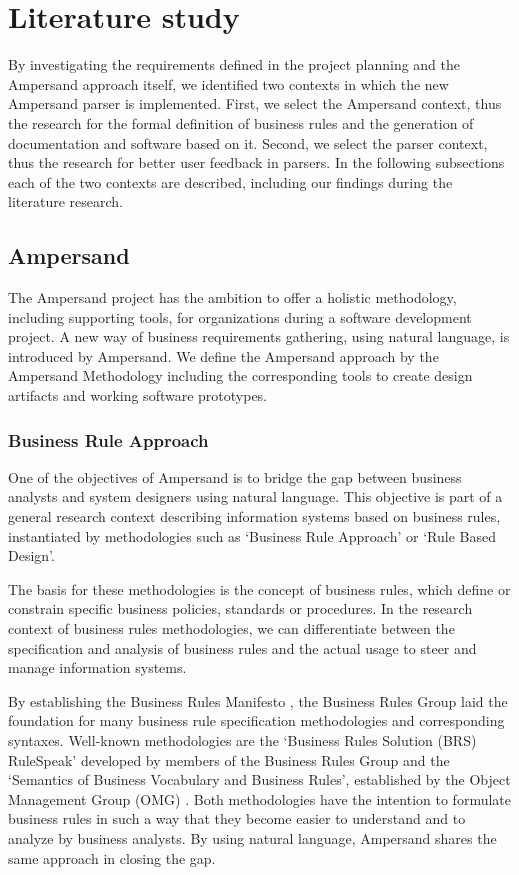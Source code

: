 
\section{Literature study}
\label{sec:literature-study}
By investigating the requirements defined in the project planning  and the Ampersand approach itself, we identified two contexts in which the new Ampersand parser is implemented.
First, we select the Ampersand context, thus the research for the formal definition of business rules and the generation of documentation and software based  on it.
Second, we select the parser context, thus the research for better user feedback in parsers.
In the following subsections each of the two contexts are described, including our findings during the literature research.

\subsection{Ampersand}
The Ampersand project has the ambition to offer a holistic methodology, including supporting tools, for organizations during a software development project.
A new way of business requirements gathering, using natural language, is introduced by Ampersand.
We define the Ampersand approach by the Ampersand Methodology including the corresponding tools to create design artifacts and working software prototypes.

\subsubsection{Business Rule Approach}
One of  the objectives of Ampersand is to bridge the gap between business analysts and system designers using natural language.
This objective is part of a general research context describing information systems based on business rules, instantiated by methodologies such as `Business Rule Approach' or `Rule Based Design'.

The basis for these methodologies is the concept of business rules, which define or constrain specific business policies, standards or procedures.
In the research context of business rules methodologies, we can differentiate between the specification and analysis of business rules and the actual usage to steer and manage information systems.

%
%
By establishing the Business Rules Manifesto , the Business Rules Group laid the foundation for many business rule specification methodologies and corresponding syntaxes.
Well-known methodologies are the `Business Rules Solution (BRS) RuleSpeak' developed by members of the Business Rules Group  and the `Semantics of Business Vocabulary and Business Rules', established by the Object Management Group (OMG) .
Both methodologies have the intention to formulate business rules in such a way that they become easier to understand and to analyze by business analysts.
By using natural language, Ampersand shares the same approach in closing the gap.


